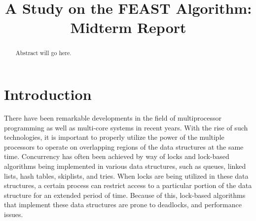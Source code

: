 \documentclass[conference]{IEEEtran}
\begin{document}
\title{A Study on the FEAST Algorithm: Midterm Report\\
}
\author{
\and
{}
\and
{}
\and
{}
}
\maketitle

\begin{abstract}
Abstract will go here.
\end{abstract}

\section{Introduction}
There have been remarkable developments in the field of multiprocessor programming as well as multi-core systems in recent years. With the rise of such technologies, it is important to properly utilize the power of the multiple processors to operate on overlapping regions of the data structures at the same time. Concurrency has often been achieved by way of locks and lock-based algorithms being implemented in various data structures, such as queues, linked lists, hash tables, skiplists, and tries. When locks are being utilized in these data structures, a certain process can restrict access to a particular portion of the data structure for an extended period of time. Because of this, lock-based algorithms that implement these data structures are prone to deadlocks, and performance issues. 
\end{document}
